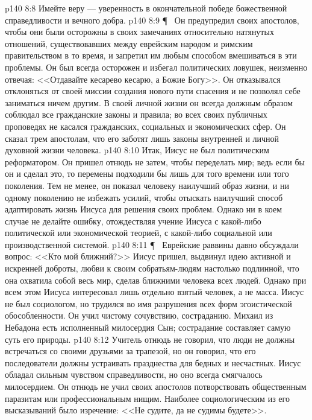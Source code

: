 \vs p140 8:8 Имейте веру --- уверенность в окончательной победе божественной справедливости и вечного добра.
\vs p140 8:9 \P\ \bibnobreakspace {} Он предупредил своих апостолов, чтобы они были осторожны в своих замечаниях относительно натянутых отношений, существовавших между еврейским народом и римским правительством в то время, и запретил им любым способом вмешиваться в эти проблемы. Он был всегда осторожен и избегал политических ловушек, неизменно отвечая: <<Отдавайте кесарево кесарю, а Божие Богу>>. Он отказывался отклоняться от своей миссии создания нового пути спасения и не позволял себе заниматься ничем другим. В своей личной жизни он всегда должным образом соблюдал все гражданские законы и правила; во всех своих публичных проповедях не касался гражданских, социальных и экономических сфер. Он сказал трем апостолам, что его заботят лишь законы внутренней и личной духовной жизни человека.
\vs p140 8:10 Итак, Иисус не был политическим реформатором. Он пришел отнюдь не затем, чтобы переделать мир; ведь если бы он и сделал это, то перемены подходили бы лишь для того времени или того поколения. Тем не менее, он показал человеку наилучший образ жизни, и ни одному поколению не избежать усилий, чтобы отыскать наилучший способ адаптировать жизнь Иисуса для решения своих проблем. Однако ни в коем случае не делайте ошибку, отождествляя учение Иисуса с какой\hyp{}либо политической или экономической теорией, с какой\hyp{}либо социальной или производственной системой.
\vs p140 8:11 \P\ \bibnobreakspace {} Еврейские раввины давно обсуждали вопрос: <<Кто мой ближний?>> Иисус пришел, выдвинул идею активной и искренней доброты, любви к своим собратьям\hyp{}людям настолько подлинной, что она охватила собой весь мир, сделав ближними человека всех людей. Однако при всем этом Иисуса интересовал лишь отдельно взятый человек, а не масса. Иисус не был социологом, но трудился во имя разрушения всех форм эгоистической обособленности. Он учил чистому сочувствию, состраданию. Михаил из Небадона есть исполненный милосердия Сын; сострадание составляет самую суть его природы.
\vs p140 8:12 Учитель отнюдь не говорил, что люди не должны встречаться со своими друзьями за трапезой, но он говорил, что его последователи должны устраивать празднества для бедных и несчастных. Иисус обладал сильным чувством справедливости, но оно всегда смягчалось милосердием. Он отнюдь не учил своих апостолов потворствовать общественным паразитам или профессиональным нищим. Наиболее социологическим из его высказываний было изречение: <<Не судите, да не судимы будете>>.
